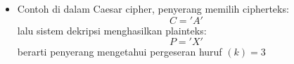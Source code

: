 \documentclass{article}
\begin{document}

\begin{itemize}
    \item Contoh di dalam Caesar cipher, penyerang memilih cipherteks:
    \[ C = 'A' \]
    lalu sistem dekripsi menghasilkan plainteks:
    \[ P = 'X' \]
    berarti penyerang mengetahui pergeseran huruf $(k) = 3$
\end{itemize}
\end{document}

